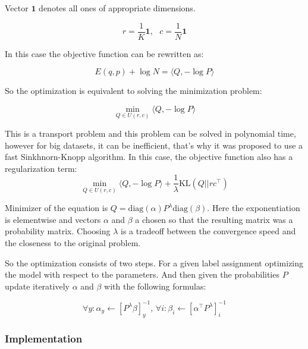 \documentclass[10pt]{article}
\begin{document}
Vector $\mathbf{1}$ denotes all ones of appropriate dimensions.

\begin{equation}
    r = \frac{1}{K}\mathbf{1}, \text{ }c = \frac{1}{N}\mathbf{1}
\end{equation}

In this case the objective function can be rewritten as:

\begin{equation}
    E(q,p) + \log N = \langle Q, -\log P\rangle
\end{equation}

So the optimization is equivalent to solving the minimization problem:

\begin{equation}
    \min_{Q\in U(r,c)} \langle Q, - \log P \rangle
\end{equation}

This is a transport problem and this problem can be solved in polynomial time, however for big datasets, it can be inefficient, that's why it was proposed to use a fast Sinkhnorn-Knopp algorithm. In this case, the objective function also has a regularization term:
\begin{equation}
    \min_{Q\in U(r,c)} \langle Q,-\log P \rangle + \frac{1}{\lambda} \mathrm{KL}(Q||rc^{\top})
\end{equation}

Minimizer of the equation is $Q =\mathrm{diag}(\alpha)P^{\lambda}\mathrm{diag}(\beta)$. Here the exponentiation is elementwise and vectors $\alpha$ and $\beta$ a chosen so that the resulting matrix was a probability matrix. Choosing $\lambda$ is a tradeoff between the convergence speed and the closeness to the original problem.

So the optimization consists of two steps. For a given label assignment optimizing the model with respect to the parameters. And then given the probabilities $P$ update iteratively  $\alpha$ and $\beta$ with the following formulas:

\begin{equation}
    \forall y: \alpha_y \leftarrow [P^{\lambda}\beta]_y^{-1} \text{, } \forall i: \beta_i \leftarrow [\alpha^{\top}P^{\lambda}]_i^{-1}
\end{equation}

\subsubsection{Implementation}
\end{document}
